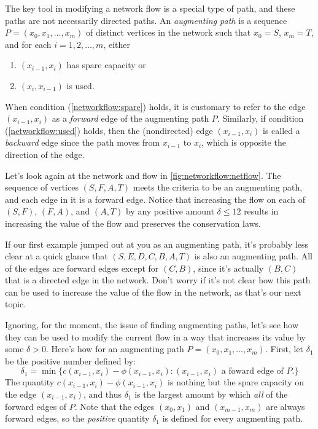 The key tool in modifying a network flow is a special type of path,
and these paths are not necessarily directed paths. An
\emph{augmenting path} is a sequence $P=(x_0,x_1,\dots,x_m)$ of
distinct vertices in the network such that $x_0=S$, $x_m=T$, and for
each $i=1,2,\dots,m$, either
\begin{enumerate}[label=(\alph*)]
\item $(x_{i-1},x_i)$ has spare capacity or\label{networkflow:spare}
\item $(x_i,x_{i-1})$ is used.\label{networkflow:used}
\end{enumerate}
When condition (\ref*{networkflow:spare}) holds, it is customary to
refer to the edge $(x_{i-1},x_i)$ as a \textit{forward} edge of the
augmenting path $P$. Similarly, if condition (\ref*{networkflow:used})
holds, then the (nondirected) edge $(x_{i-1},x_i)$ is called a
\textit{backward} edge since the path moves from $x_{i-1}$ to $x_i$,
which is opposite the direction of the edge.

\begin{example}\label{exa:networkflow:augpath}
  Let's look again at the network and flow in
  \autoref{fig:networkflow:netflow}. The sequence of vertices
  $(S,F,A,T)$ meets the criteria to be an augmenting path, and each
  edge in it is a forward edge. Notice that increasing the flow on
  each of $(S,F)$, $(F,A)$, and $(A,T)$ by any positive amount $\delta
  \leq 12$ results in increasing the value of the flow and preserves
  the conservation laws.

  If our first example jumped out at you as an augmenting path, it's
  probably less clear at a quick glance that $(S,E,D,C,B,A,T)$ is also
  an augmenting path. All of the edges are forward edges except for
  $(C,B)$, since it's actually $(B,C)$ that is a directed edge in the
  network. Don't worry if it's not clear how this path can be used to
  increase the value of the flow in the network, as that's our next
  topic.
\end{example}

Ignoring, for the moment, the issue of finding augmenting paths, let's
see how they can be used to modify the current flow in a way that
increases its value by some $\delta > 0$. Here's how for an augmenting
path $P=(x_0,x_1,\dots,x_m)$. First, let $\delta_1$ be the positive
number defined by:
\[
\delta_1 =\min\{c(x_{i-1},x_i)-\phi(x_{i-1},x_i):(x_{i-1},x_i) 
\text{ a foward edge of } P.\}
\]
The quantity $c(x_{i-1},x_i)-\phi(x_{i-1},x_i)$ is nothing but the
spare capacity on the edge $(x_{i-1},x_i)$, and thus $\delta_1$ is the
largest amount by which \emph{all} of the forward edges of $P$. Note
that the edges $(x_0,x_1)$ and $(x_{m-1},x_m)$ are always forward
edges, so the \emph{positive} quantity $\delta_1$ is defined for every
augmenting path.

